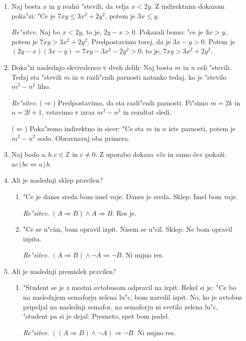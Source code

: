 \documentclass[11pt,paper=b5,DIV=13,headinclude,footinclude]{scrbook}
\begin{document}
\begin{enumerate}
\item Naj bosta $x$ in $y$ realni "stevili, da velja $x<2y$. Z indirektnim dokazom poka"zi: "Ce je $7xy\leq 3x^2 + 2y^2$, potem je $3x\leq y$.

\emph{ Re"sitev.} Naj bo $x<2y$, to je, $2y-x>0$. Pokazali bomo: "ce je $3x> y$, potem je $7xy > 3x^2 + 2y^2$. Predpostavimo torej, da je $3x-y>0$. Potem je $(2y-x)(3x-y)= 7xy - 3x^2 - 2y^2>0$, to je, $7xy > 3x^2 + 2y^2$.

\item Doka"zi naslednjo ekvivalenco v dveh delih: Naj bosta $m$ in $n$ celi "stevili. Tedaj sta "stevili $m$ in $n$ razli"cnih parnosti natanko tedaj, ko je "stevilo $m^2- n^2$ liho.

\emph{ Re"sitev.} ($\Rightarrow$) Predpostavimo, da sta razli"cnih parnosti. Pi"simo  $m=2k$ in $n=2l+1$, vstavimo v izraz $m^2- n^2$ in rezultat sledi.

($\Leftarrow$) Poka"zemo indirektno in sicer: "Ce sta $m$ in $n$ iste parnosti, potem je $m^2- n^2$ sodo. Obravnavaj oba primera.


\item Naj bodo $a,b,c\in\mathbb{Z}$ in $c\neq 0$. Z uporabo dokaza »če in
samo če« pokaži: $ac\,|\,bc \Leftrightarrow a\,|\,b$.

\item Ali je naslednji sklep pravilen?
\begin{enumerate}
\item[(i)] "Ce je danes sreda bom imel vaje. Danes je sreda. Sklep: Imel bom vaje.

\emph{ Re"sitev.} $(A\Rightarrow B) \wedge A \Rightarrow B$. Res je.

\item[(ii)] "Ce se u"cim, bom opravil izpit. Nisem se u"cil. Sklep: Ne bom opravil izpita.

\emph{ Re"sitev.} $(A\Rightarrow B) \wedge \neg A \Rightarrow \neg B$. Ni nujno res.
\end{enumerate}

\item Ali je naslednji premislek pravilen?
\begin{enumerate}
\item[(i)] "Student se je z mestni avtobusom odpravil na izpit. Rekel si je: "Ce bo na naslednjem semaforju zelena lu"c, bom naredil izpit. No, ko je avtobus pripeljal na naslednji semafor, na semaforju ni svetila zelena lu"c, "student pa si je dejal: Presneto, spet bom padel.

\emph{ Re"sitev.} $((A\Rightarrow B) \wedge \neg A) \Rightarrow \neg B$. Ni nujno res.


\end{enumerate}
\end{enumerate}
\end{document}
